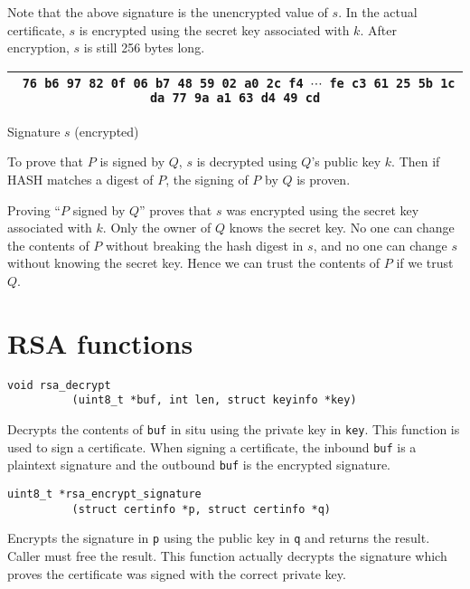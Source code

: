 \documentclass[12pt]{article}
\begin{document}
\bigskip
\noindent
Note that the above signature is the unencrypted value of $s$.
In the actual certificate, $s$ is encrypted using the secret key associated with $k$.
After encryption, $s$ is still 256 bytes long.

\begin{center}
\begin{tabular}{|c|}
\hline
{\footnotesize\tt
76 b6 97 82 0f 06 b7 48 59 02 a0 2c f4 $\cdots$
fe c3 61 25 5b 1c da 77 9a a1 63 d4 49 cd}\\
\hline
\end{tabular}

\medskip
Signature $s$ (encrypted)
\end{center}

\noindent
To prove that $P$ is signed by $Q$, $s$ is decrypted using $Q$'s public key $k$.
Then if HASH matches a digest of $P$, the signing of $P$ by $Q$ is proven.

\bigskip
\noindent
Proving ``$P$ signed by $Q$'' proves that $s$ was encrypted using the secret key associated with $k$.
Only the owner of $Q$ knows the secret key.
No one can change the contents of $P$ without breaking the hash digest in $s$,
and no one can change $s$ without knowing the secret key.
Hence we can trust the contents of $P$ if we trust $Q$.

\newpage
\section{RSA functions}

\bigskip
\bigskip
\begin{verbatim}
void rsa_decrypt
          (uint8_t *buf, int len, struct keyinfo *key)
\end{verbatim}

\noindent
Decrypts the contents of {\tt buf} in situ using the private key in {\tt key}.
This function is used to sign a certificate.
When signing a certificate, the inbound
{\tt buf} is a plaintext signature and the outbound {\tt buf} is the encrypted
signature.

\bigskip
\bigskip
\begin{verbatim}
uint8_t *rsa_encrypt_signature
          (struct certinfo *p, struct certinfo *q)
\end{verbatim}

\noindent
Encrypts the signature in {\tt p} using the public key in {\tt q} and returns the result.
Caller must free the result.
This function actually decrypts the signature which proves the certificate was signed
with the correct private key.
\end{document}
